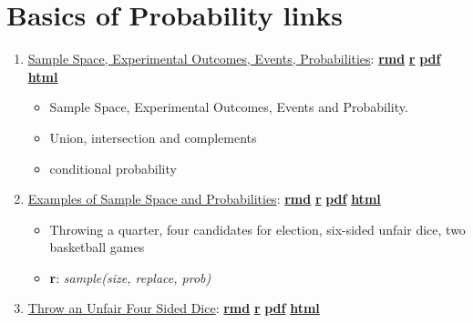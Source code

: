 \documentclass[
]{book}
\providecommand{\tightlist}{%
  \setlength{\itemsep}{0pt}\setlength{\parskip}{0pt}}
\begin{document}
\hypertarget{basics-of-probability-links}{%
\section{Basics of Probability links}\label{basics-of-probability-links}}

\begin{enumerate}
\def\labelenumi{\arabic{enumi}.}
\tightlist
\item
  \href{https://fanwangecon.github.io/Stat4Econ/probability/htmlpdfr/samplespace.html}{Sample Space, Experimental Outcomes, Events, Probabilities}: \href{https://github.com/FanWangEcon/Stat4Econ/blob/master/probability//samplespace.Rmd}{\textbf{rmd}} \textbar{} \href{https://github.com/FanWangEcon/Stat4Econ/blob/master/probability/htmlpdfr/samplespace.R}{\textbf{r}} \textbar{} \href{https://github.com/FanWangEcon/Stat4Econ/blob/master/probability/htmlpdfr/samplespace.pdf}{\textbf{pdf}} \textbar{} \href{https://fanwangecon.github.io/Stat4Econ/probability/htmlpdfr/samplespace.html}{\textbf{html}}

  \begin{itemize}
  \tightlist
  \item
    Sample Space, Experimental Outcomes, Events and Probability.
  \item
    Union, intersection and complements
  \item
    conditional probability
  \end{itemize}
\item
  \href{https://fanwangecon.github.io/Stat4Econ/probability/htmlpdfr/samplespaceexa.html}{Examples of Sample Space and Probabilities}: \href{https://github.com/FanWangEcon/Stat4Econ/blob/master/probability//samplespaceexa.Rmd}{\textbf{rmd}} \textbar{} \href{https://github.com/FanWangEcon/Stat4Econ/blob/master/probability/htmlpdfr/samplespaceexa.R}{\textbf{r}} \textbar{} \href{https://github.com/FanWangEcon/Stat4Econ/blob/master/probability/htmlpdfr/samplespaceexa.pdf}{\textbf{pdf}} \textbar{} \href{https://fanwangecon.github.io/Stat4Econ/probability/htmlpdfr/samplespaceexa.html}{\textbf{html}}

  \begin{itemize}
  \tightlist
  \item
    Throwing a quarter, four candidates for election, six-sided unfair dice, two basketball games
  \item
    \textbf{r}: \emph{sample(size, replace, prob)}
  \end{itemize}
\item
  \href{https://fanwangecon.github.io/Stat4Econ/probability/htmlpdfr/samplespacedice.html}{Throw an Unfair Four Sided Dice}: \href{https://github.com/FanWangEcon/Stat4Econ/blob/master/probability//samplespacedice.Rmd}{\textbf{rmd}} \textbar{} \href{https://github.com/FanWangEcon/Stat4Econ/blob/master/probability/htmlpdfr/samplespacedice.R}{\textbf{r}} \textbar{} \href{https://github.com/FanWangEcon/Stat4Econ/blob/master/probability/htmlpdfr/samplespacedice.pdf}{\textbf{pdf}} \textbar{} \href{https://fanwangecon.github.io/Stat4Econ/probability/htmlpdfr/samplespacedice.html}{\textbf{html}}


\end{enumerate}
\end{document}
